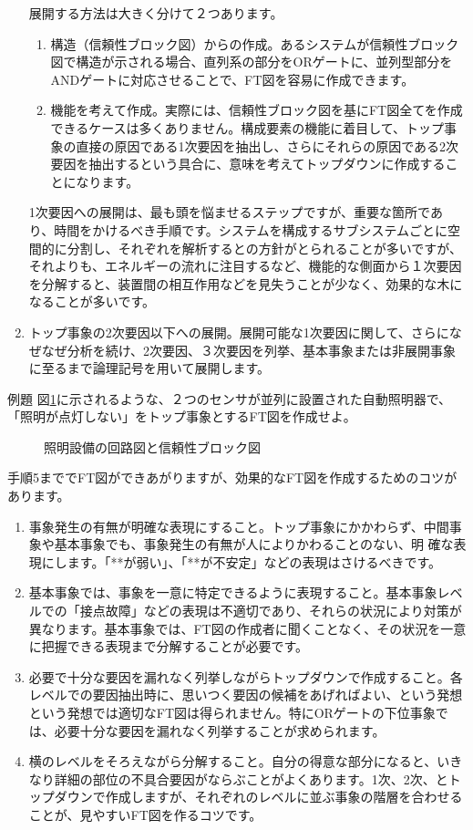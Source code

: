 \begin{enumerate}
展開する方法は大きく分けて２つあります。
\begin{enumerate}
\item 構造（信頼性ブロック図）からの作成。あるシステムが信頼性ブロック図で構造が示される場合、直列系の部分をORゲートに、並列型部分をANDゲートに対応させることで、FT図を容易に作成できます。
\item 機能を考えて作成。実際には、信頼性ブロック図を基にFT図全てを作成できるケースは多くありません。構成要素の機能に着目して、トップ事象の直接の原因である1次要因を抽出し、さらにそれらの原因である2次要因を抽出するという具合に、意味を考えてトップダウンに作成することになります。
\end{enumerate}
1次要因への展開は、最も頭を悩ませるステップですが、重要な箇所であり、時間をかけるべき手順です。システムを構成するサブシステムごとに空間的に分割し、それぞれを解析するとの方針がとられることが多いですが、それよりも、エネルギーの流れに注目するなど、機能的な側面から１次要因を分解すると、装置間の相互作用などを見失うことが少なく、効果的な木になることが多いです。
\item トップ事象の2次要因以下への展開。展開可能な1次要因に関して、さらになぜなぜ分析を続け、2次要因、３次要因を列挙、基本事象または非展開事象に至るまで論理記号を用いて展開します。
\end{enumerate}
例題 図\ref{41}に示されるような、２つのセンサが並列に設置された自動照明器で、「照明が点灯しない」をトップ事象とするFT図を作成せよ。
\begin{figure}[htbp]
\begin{center}
\end{center}
\caption{照明設備の回路図と信頼性ブロック図}
\label{41}
\end{figure}

手順5まででFT図ができあがりますが、効果的なFT図を作成するためのコツがあります。
\renewcommand{\labelenumi}{\roman{enumi})}

\begin{enumerate}
\item 事象発生の有無が明確な表現にすること。トップ事象にかかわらず、中間事象や基本事象でも、事象発生の有無が人によりかわることのない、明
確な表現にします。「**が弱い」、「**が不安定」などの表現はさけるべきです。
\item 基本事象では、事象を一意に特定できるように表現すること。基本事象レベルでの「接点故障」などの表現は不適切であり、それらの状況により対策が異なります。基本事象では、FT図の作成者に聞くことなく、その状況を一意に把握できる表現まで分解することが必要です。
\item 必要で十分な要因を漏れなく列挙しながらトップダウンで作成すること。各レベルでの要因抽出時に、思いつく要因の候補をあげればよい、という発想という発想では適切なFT図は得られません。特にORゲートの下位事象では、必要十分な要因を漏れなく列挙することが求められます。
\item 横のレベルをそろえながら分解すること。自分の得意な部分になると、いきなり詳細の部位の不具合要因がならぶことがよくあります。1次、2次、とトップダウンで作成しますが、それぞれのレベルに並ぶ事象の階層を合わせることが、見やすいFT図を作るコツです。
\end{enumerate}
